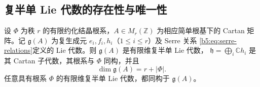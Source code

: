 \subsection{复半单 Lie 代数的存在性与唯一性}
\label{b5:subsec:1704:02}

\begin{theorem}[Serre 展示]\label{b5:thm:serre-presentation}
	设 \(\Phi\) 为秩 \(r\) 的有限约化结晶根系，\(A\in M_r(\mathbb Z)\) 为相应简单根基下的 Cartan 矩阵。记 \(\mathfrak g(A)\) 为复生成元 \(e_i,f_i,h_i\)（\(1\le i\le r\)）及 Serre 关系 \eqref{b5:eq:serre-relations}定义的 Lie 代数。则 \(\mathfrak g(A)\) 是有限维复半单 Lie 代数， \(\mathfrak h=\bigoplus_i\mathbb Ch_i\) 是其 Cartan 子代数，其根系与 \(\Phi\) 同构，并且
	\[
		\dim\mathfrak g(A)=r+|\Phi|.
	\]
	任意具有根系 \(\Phi\) 的有限维复半单 Lie 代数，都同构于 \(\mathfrak g(A)\)。
\end{theorem}
